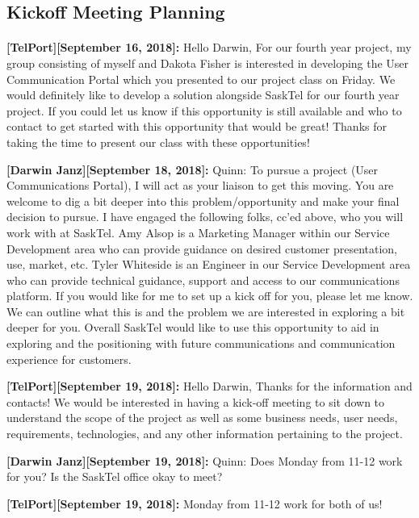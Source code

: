 \documentclass[12pt]{article}
\begin{document}
\subsection{Kickoff Meeting Planning}


\paragraph{}
\textbf{[TelPort][September 16, 2018]:} Hello Darwin, For our fourth year project, my group consisting of myself and Dakota Fisher is interested in developing the User Communication Portal which you presented to our project class on Friday. We would definitely like to develop a solution alongside SaskTel for our fourth year project. If you could let us know if this opportunity is still available and who to contact to get started with this opportunity that would be great! Thanks for taking the time to present our class with these opportunities!

\textbf{[Darwin Janz][September 18, 2018]:} Quinn: To pursue a project (User Communications Portal), I will act as your liaison to get this moving.  You are welcome to dig a bit deeper into this problem/opportunity and make your final decision to pursue. I have engaged the following folks,  cc'ed above, who you will work with at SaskTel. Amy Alsop is a Marketing Manager within our Service Development area who can provide guidance on desired customer presentation, use, market, etc. Tyler Whiteside is an Engineer in our Service Development area who can provide technical guidance, support and access to our communications platform. If you would like for me to set up a kick off for you, please let me know.  We can outline what this is and the problem we are interested in exploring a bit deeper for you. Overall SaskTel would like to use this opportunity to aid in exploring and the positioning with future communications and communication experience for customers.

\textbf{[TelPort][September 19, 2018]:} Hello Darwin, Thanks for the information and contacts! We would be interested in having a kick-off meeting to sit down to understand the scope of the project as well as some business needs, user needs, requirements, technologies, and any other information pertaining to the project. 

\textbf{[Darwin Janz][September 19, 2018]:} Quinn: Does Monday from 11-12 work for you?  Is the SaskTel office okay to meet?

\textbf{[TelPort][September 19, 2018]:} Monday from 11-12 work for both of us!
\end{document}
